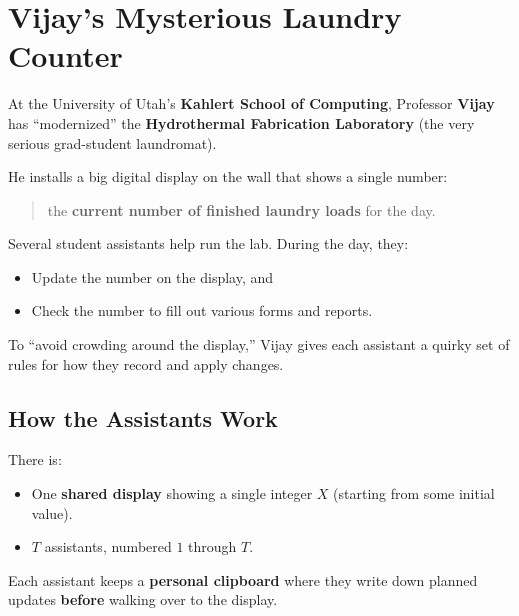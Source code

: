 \section*{Vijay's Mysterious Laundry Counter}

At the University of Utah's \textbf{Kahlert School of Computing}, Professor
\textbf{Vijay} has ``modernized'' the \textbf{Hydrothermal Fabrication
Laboratory} (the very serious grad-student laundromat).

He installs a big digital display on the wall that shows a single number:

\begin{quote}
the \textbf{current number of finished laundry loads} for the day.
\end{quote}

Several student assistants help run the lab. During the day, they:
\begin{itemize}[nosep]
    \item Update the number on the display, and
    \item Check the number to fill out various forms and reports.
\end{itemize}

To ``avoid crowding around the display,'' Vijay gives each assistant a quirky
set of rules for how they record and apply changes.

\subsection*{How the Assistants Work}

There is:
\begin{itemize}[nosep]
    \item One \textbf{shared display} showing a single integer \(X\) (starting
    from some initial value).
    \item \(T\) assistants, numbered \(1\) through \(T\).
\end{itemize}

Each assistant keeps a \textbf{personal clipboard} where they write down planned
updates \textbf{before} walking over to the display.

